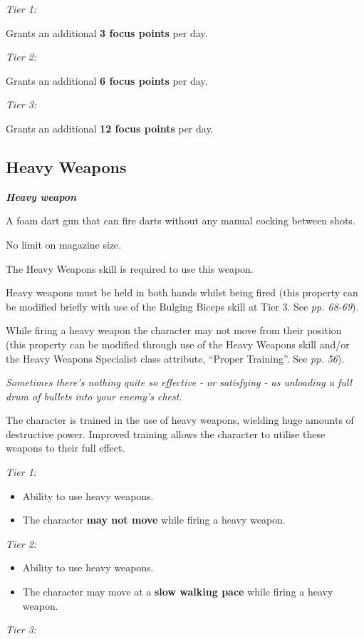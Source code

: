\documentclass{scrbook}
\begin{document}
\textit{Tier 1:}

Grants an additional \textbf{3 focus points} per day.

\textit{Tier 2:}

Grants an additional \textbf{6 focus points} per day.

\textit{Tier 3:}

Grants an additional \textbf{12 focus points} per day.

\subsection{Heavy Weapons}

\textbf{\textit{Heavy weapon}}

A foam dart gun that can fire darts without any manual cocking between shots.

No limit on magazine size.

The Heavy Weapons skill is required to use this weapon.

Heavy weapons must be held in both hands whilst being fired (this property can be modified briefly with use of the Bulging Biceps skill at Tier 3. See \textit{pp. 68-69}).

While firing a heavy weapon the character may not move from their position (this property can be modified through use of the Heavy Weapons skill and/or the Heavy Weapons Specialist class attribute, ``Proper Training''. See \textit{pp. 56}).

\textit{Sometimes there's nothing quite so effective - or satisfying - as unloading a full drum of bullets into your enemy's chest.}

The character is trained in the use of heavy weapons, wielding huge amounts of destructive power. Improved training allows the character to utilise these weapons to their full effect.

\textit{Tier 1:}

\begin{itemize}
\item Ability to use heavy weapons.

\item The character \textbf{may not move} while firing a heavy weapon.

\end{itemize}
\textit{Tier 2:}

\begin{itemize}
\item Ability to use heavy weapons.

\item The character may move at a \textbf{slow walking pace} while firing a heavy weapon.

\end{itemize}
\textit{Tier 3:}
\end{document}
